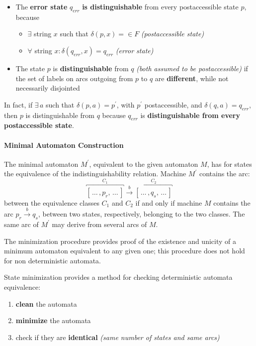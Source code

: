 \documentclass[english]{article}
\begin{document}
\begin{itemize}[label=\(\Rightarrow\)]
  \item The \textbf{error state} \(q_\textit{err}\) \textbf{is distinguishable} from every postaccessible state \(p\), because
        \begin{itemize}
          \item \(\exists\) string \(x\) such that \(\delta(p, x) = \in F\) \textit{(postaccessible state)}
          \item \(\forall\) string \(x: \delta(q_\textit{err}, x) = q_\textit{err}\) \textit{(error state)}
        \end{itemize}
  \item The state \(p\) is \textbf{distinguishable} from \(q\) \textit{(both assumed to be postaccessible)} if the set of labels on arcs outgoing from \(p\) to \(q\) are \textbf{different}, while not necessarily disjointed
\end{itemize}

In fact, if \(\exists \, a\) such that \(\delta(p, a) = p^\prime\), with \(p^\prime\) postaccessible, and \(\delta(q, a) = q_\textit{err}\), then \(p\) is distinguishable from \(q\) because \(q_\textit{err}\) is \textbf{distinguishable from every postaccessible state}.

\paragraph{Minimal Automaton Construction}

The minimal automaton \(M^\prime\), equivalent to the given automaton \(M\), has for states the equivalence of the indistinguishability relation.
Machine \(M^\prime\) contains the arc:
\[ \overbracket{\left[ \,\ldots\, , p_r, \,\ldots\,  \right]}^{C_1} \xrightarrow{b} \overbracket{\left[ \,\ldots\, , q_s, \,\ldots\,  \right]}^{C_2} \]
between the equivalence classes \(C_1\) and \(C_2\) if and only if machine \(M\) contains the arc \(p_r \xrightarrow{b} q_s\), between two states, respectively, belonging to the two classes.
The same arc of \(M^\prime\) may derive from several arcs of \(M\).

The minimization procedure provides proof of the existence and unicity of a minimum automaton equivalent to any given one;
this procedure does not hold for non deterministic automata.

State minimization provides a method for checking deterministic automata equivalence:

\begin{enumerate}
  \item \textbf{clean} the automata
  \item \textbf{minimize} the automata
  \item check if they are \textbf{identical} \textit{(same number of states and same arcs)}
\end{enumerate}
\end{document}
